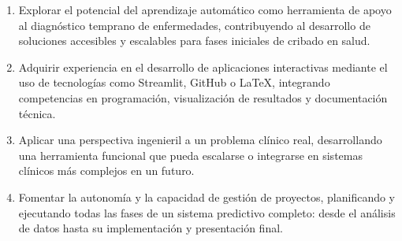 \begin{enumerate}
    \item Explorar el potencial del aprendizaje automático como herramienta de apoyo al diagnóstico temprano de enfermedades, contribuyendo al desarrollo de soluciones accesibles y escalables para fases iniciales de cribado en salud.
    \item Adquirir experiencia en el desarrollo de aplicaciones interactivas mediante el uso de tecnologías como Streamlit, GitHub o LaTeX, integrando competencias en programación, visualización de resultados y documentación técnica.
    \item Aplicar una perspectiva ingenieril a un problema clínico real, desarrollando una herramienta funcional que pueda escalarse o integrarse en sistemas clínicos más complejos en un futuro.
    \item Fomentar la autonomía y la capacidad de gestión de proyectos, planificando y ejecutando todas las fases de un sistema predictivo completo: desde el análisis de datos hasta su implementación y presentación final.
\end{enumerate}